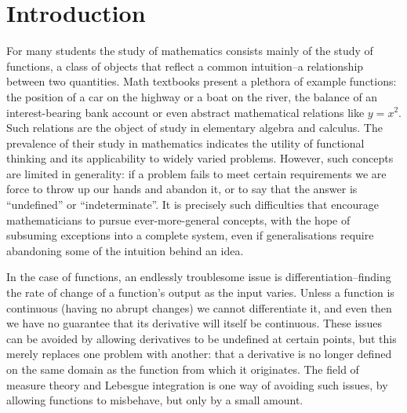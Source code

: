 \chapter*{Introduction}

  For many students the study of mathematics consists mainly of the study of functions, a class of objects that reflect a common intuition--a relationship between two quantities.
  Math textbooks present a plethora of example functions: the position of a car on the highway or a boat on the river, the balance of an interest-bearing bank account or even abstract mathematical relations like $y=x^2$.
  Such relations are the object of study in elementary algebra and calculus. 
  The prevalence of their study in mathematics indicates the utility of functional thinking and its applicability to widely varied problems.
  However, such concepts are limited in generality: if a problem fails to meet certain requirements we are force to throw up our hands and abandon it, or to say that the answer is ``undefined'' or ``indeterminate''.
  It is precisely such difficulties that encourage mathematicians to pursue ever-more-general concepts, with the hope of subsuming exceptions into a complete system, even if generalisations require abandoning some of the intuition behind an idea.

  In the case of functions, an endlessly troublesome issue is differentiation--finding the rate of change of a function's output as the input varies.
  Unless a function is continuous (having no abrupt changes) we cannot differentiate it, and even then we have no guarantee that its derivative will itself be continuous.
  These issues can be avoided by allowing derivatives to be undefined at certain points, but this merely replaces one problem with another: that a derivative is no longer defined on the same domain as the function from which it originates.
  The field of measure theory and Lebesgue integration is one way of avoiding such issues, by allowing functions to misbehave, but only by a small amount.

